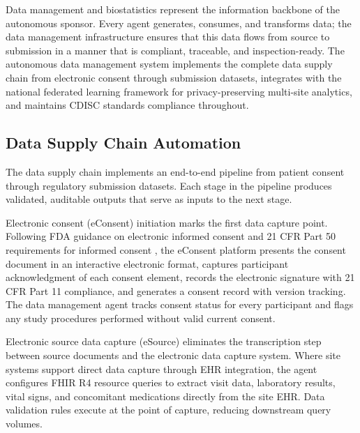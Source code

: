 
Data management and biostatistics represent the information backbone of the autonomous
sponsor. Every agent generates, consumes, and transforms data; the data management
infrastructure ensures that this data flows from source to submission in a manner that is
compliant, traceable, and inspection-ready. The autonomous data management system
implements the complete data supply chain from electronic consent through submission datasets,
integrates with the national federated learning framework for privacy-preserving multi-site
analytics, and maintains CDISC standards compliance throughout.

\subsection{Data Supply Chain Automation}

The data supply chain implements an end-to-end pipeline from patient consent through
regulatory submission datasets. Each stage in the pipeline produces validated, auditable
outputs that serve as inputs to the next stage.

Electronic consent (eConsent) initiation marks the first data capture point. Following FDA
guidance on electronic informed consent \cite{fda-econsent} and 21 CFR Part 50 requirements
for informed consent \cite{cfr-part-50}, the eConsent platform presents the consent document
in an interactive electronic format, captures participant acknowledgment of each consent
element, records the electronic signature with 21 CFR Part 11 compliance, and generates
a consent record with version tracking. The data management agent tracks consent status for
every participant and flags any study procedures performed without valid current consent.

Electronic source data capture (eSource) eliminates the transcription step between source
documents and the electronic data capture system. Where site systems support direct data
capture through EHR integration, the agent configures FHIR R4 \cite{hl7-fhir} resource
queries to extract visit data, laboratory results, vital signs, and concomitant medications
directly from the site EHR. Data validation rules execute at the point of capture, reducing
downstream query volumes.

